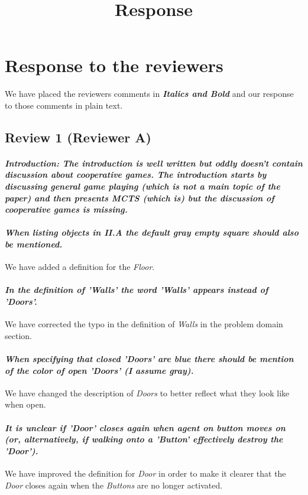 \documentclass{article}
\title{Response}
\begin{document}
\maketitle
\section{Response to the reviewers}
We have placed the reviewers comments in \textit{\textbf{Italics and Bold}} and our response to those comments in plain text.

\subsection{Review 1 (Reviewer A)}
\paragraph*{\textit{Introduction: The introduction is well written but oddly doesn't contain discussion about cooperative games. The introduction starts by discussing general game playing (which is not a main topic of the paper) and then presents MCTS (which is) but the discussion of cooperative games is missing.}}

\paragraph*{\textit{When listing objects in  II.A the default gray empty square should also be mentioned.}}
We have added a definition for the \emph{Floor}.
\paragraph*{\textit{In the definition of 'Walls' the word 'Walls' appears instead of 'Doors'.}}
We have corrected the typo in the definition of \emph{Walls} in the problem domain section.
\paragraph*{\textit{When specifying that closed 'Doors' are blue there should be mention of the color of open 'Doors' (I assume gray).}}
We have changed the description of \emph{Doors} to better reflect what they look like when open.
\paragraph*{\textit{It is unclear if 'Door' closes again when agent on button moves on (or, alternatively, if walking onto a 'Button' effectively destroy the 'Door').}}
We have improved the definition for \emph{Door} in order to make it clearer that the \emph{Door} closes again when the \emph{Buttons} are no longer activated.
\end{document}

